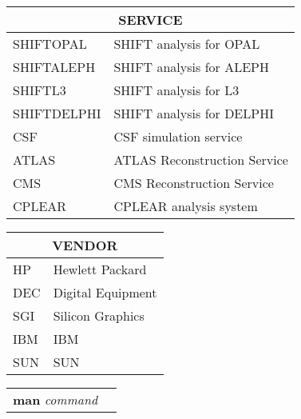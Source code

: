 \newpage

{\samepage \clearpage \begin{tabular}{ll}
\multicolumn{2}{c}{SERVICE} \\  
\hline
SHIFTOPAL    & SHIFT analysis for OPAL                       \\  
SHIFTALEPH   & SHIFT analysis for ALEPH                      \\  
SHIFTL3      & SHIFT analysis for L3                         \\  
SHIFTDELPHI  & SHIFT analysis for DELPHI                     \\  
CSF          & CSF simulation service                        \\  
ATLAS        & ATLAS Reconstruction Service                  \\  
CMS          & CMS Reconstruction Service                    \\  
CPLEAR       & CPLEAR analysis system                        \\  
\end{tabular}
}


\newpage

{\samepage \clearpage \begin{tabular}{ll}
\multicolumn{2}{c}{VENDOR} \\  
\hline
HP           & Hewlett Packard                               \\  
DEC          & Digital Equipment                             \\  
SGI          & Silicon Graphics                              \\  
IBM          & IBM                                           \\  
SUN          & SUN                                           \\  
\end{tabular}
}


\newpage

{\samepage \clearpage \begin{tabular}{ll}
{\bf man } {\it command}
\end{tabular}
}



